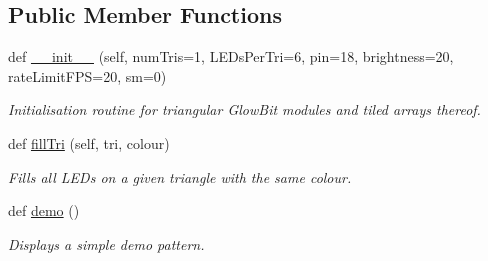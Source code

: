 \subsection*{Public Member Functions}
\begin{DoxyCompactItemize}
\item 
def \hyperlink{classglowbit_1_1triangle_aa9ff905dd6cde53bf8a39b3f8cb9482f}{\+\_\+\+\_\+init\+\_\+\+\_\+} (self, num\+Tris=1, L\+E\+Ds\+Per\+Tri=6, pin=18, brightness=20, rate\+Limit\+F\+PS=20, sm=0)
\begin{DoxyCompactList}\small\item\em Initialisation routine for triangular Glow\+Bit modules and tiled arrays thereof. \end{DoxyCompactList}\item 
def \hyperlink{classglowbit_1_1triangle_a26f35bf61d507d755ce039f4a0210c08}{fill\+Tri} (self, tri, colour)
\begin{DoxyCompactList}\small\item\em Fills all L\+E\+Ds on a given triangle with the same colour. \end{DoxyCompactList}\item 
\mbox{\label{classglowbit_1_1triangle_a783a1cdfb7b281f7ead417004a89c804}} 
def \hyperlink{classglowbit_1_1triangle_a783a1cdfb7b281f7ead417004a89c804}{demo} ()
\begin{DoxyCompactList}\small\item\em Displays a simple demo pattern. \end{DoxyCompactList}\end{DoxyCompactItemize}
